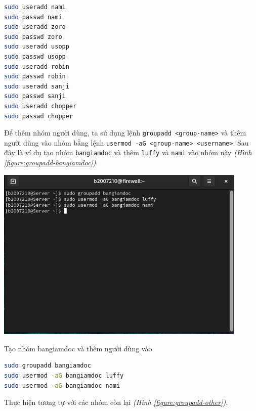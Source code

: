 \documentclass[a4paper, 11pt]{article}
\begin{document}
\begin{lstlisting}[language=bash, caption=Tạo và đặt mật khẩu cho các người dùng còn lại]
sudo useradd nami
sudo passwd nami
sudo useradd zoro
sudo passwd zoro
sudo useradd usopp
sudo passwd usopp
sudo useradd robin
sudo passwd robin
sudo useradd sanji
sudo passwd sanji
sudo useradd chopper
sudo passwd chopper
\end{lstlisting}

Để thêm nhóm người dùng, ta sử dụng lệnh \texttt{groupadd <group-name>} và thêm người dùng vào nhóm bằng lệnh \texttt{usermod -aG <group-name> <username>}.
Sau đây là ví dụ tạo nhóm \texttt{bangiamdoc} và thêm \texttt{luffy} và \texttt{nami} vào nhóm này \textit{(Hình \ref{figure:groupadd-bangiamdoc})}.

\begin{minipage}
    {\linewidth}
    \captionsetup{type=figure}
    \centering
    \includegraphics[width=12cm]{images/groupadd-bangiamdoc.png}
    \caption{Tạo nhóm bangiamdoc và thêm người dùng vào}
    \label{figure:groupadd-bangiamdoc}
\end{minipage}

\begin{lstlisting}[language=bash, caption=Tạo nhóm \texttt{bangiamdoc} và thêm người dùng vào]
sudo groupadd bangiamdoc
sudo usermod -aG bangiamdoc luffy
sudo usermod -aG bangiamdoc nami
\end{lstlisting}

Thực hiện tương tự với các nhóm còn lại \textit{(Hình \ref{figure:groupadd-other})}.
\end{document}
